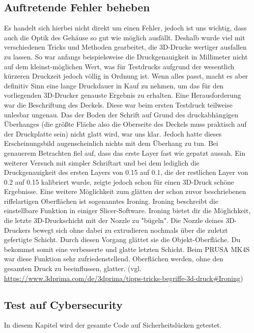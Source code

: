 \documentclass[11pt, twoside]{article}
\begin{document}
\subsection{Auftretende Fehler beheben}
Es handelt sich hierbei nicht direkt um einen Fehler, jedoch ist uns wichtig, dass auch die Optik des Gehäuse so gut wie möglich ausfällt. Deshalb wurde viel mit verschiedenen Tricks und Methoden gearbeitet, die 3D-Drucke wertiger ausfallen zu lassen.\newline
So war anfangs beispielsweise die Druckgenauigkeit in Millimeter nicht auf dem kleinst-möglichen Wert, was für Testdrucks aufgrund der wesentlich kürzeren Druckzeit jedoch völlig in Ordnung ist. Wenn alles passt, macht es aber definitiv Sinn eine lange Druckdauer in Kauf zu nehmen, um das für den vorliegenden 3D-Drucker genauste Ergebnis zu erhalten.\newline
Eine Herausforderung war die Beschriftung des Deckels. Diese war beim ersten Testdruck teilweise unlesbar ungenau. Das der \glqq Boden\grqq{} der Schrift auf Grund des druckabhängigen Überhanges (die größte Fläche also die Oberseite des Deckels muss praktisch auf der Druckplatte sein) nicht glatt wird, war uns klar. Jedoch hatte dieses Erscheinungsbild augenscheinlich nichts mit dem Überhang zu tun. Bei genauerem Betrachten fiel auf, dass das erste Layer fast wie gepatzt aussah. Ein weiterer Versuch mit simpler Schriftart und bei dem lediglich die Druckgenauigkeit des ersten Layers von 0.15 auf 0.1, die der restlichen Layer von 0.2 auf 0.15 kalibriert wurde, zeigte jedoch schon für einen 3D-Druck schöne Ergebnisse.\newline
Eine weitere Möglichkeit zum glätten der schon zuvor beschriebenen riffelartigen Oberflächen ist sogenanntes Ironing. \glqq Ironing beschreibt die einstellbare Funktion in einiger Slicer-Software. Ironing bietet dir die Möglichkeit, die letzte 3D-Druckschicht mit der Nozzle zu "bügeln". Die Nozzle deines 3D-Druckers bewegt sich ohne dabei zu extrudieren nochmals über die zuletzt gefertigte Schicht. Durch diesen Vorgang glättet sie die Objekt-Oberfläche. Du bekommst somit eine verbesserte und glatte letzten Schicht.\grqq{} Beim PRUSA MK4S war diese Funktion sehr zufriedenstellend. Oberflächen werden, ohne den gesamten Druck zu beeinflussen, glatter.\newline
\vspace{4mm}\newline
(vgl. \url{https://www.3dprima.com/de/3dprima/tipps-tricks-begriffe-3d-druck#Ironing})
\subsection{Test auf Cybersecurity}
In diesem Kapitel wird der gesamte Code auf Sicherheitslücken getestet.
\end{document}
